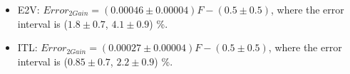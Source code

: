 
\begin{itemize}
    \item E2V: $Error_{2Gain} = (0.00046 \pm 0.00004) F - (0.5 \pm 0.5)$, where the error interval is ($1.8 \pm 0.7$, $4.1 \pm 0.9$) \%.
    \item ITL: $Error_{2Gain} = (0.00027 \pm 0.00004) F - (0.5 \pm 0.5)$, where the error interval is ($0.85 \pm 0.7$, $2.2 \pm 0.9$) \%.
\end{itemize}
 
